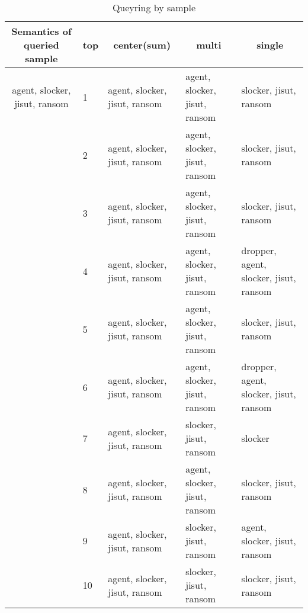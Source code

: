 \begin{table*}%
\caption{Queyring by sample}
\label{tab:sample_query_result}
\begin{minipage}{\textwidth}
\begin{center}
\begin{tabular}{@{}lllll@{}}
\toprule
\multicolumn{1}{c}{Semantics of queried sample}   & top & \multicolumn{1}{c}{center(sum)} & \multicolumn{1}{c}{multi}     & \multicolumn{1}{c}{single}             \\ \midrule
\multicolumn{1}{c}{agent, slocker, jisut, ransom} & 1   & agent, slocker, jisut, ransom  & agent, slocker, jisut, ransom & slocker, jisut, ransom                 \\
                                                  & 2   & agent, slocker, jisut, ransom  & agent, slocker, jisut, ransom & slocker, jisut, ransom                 \\
                                                  & 3   & agent, slocker, jisut, ransom  & agent, slocker, jisut, ransom & slocker, jisut, ransom                 \\
                                                  & 4   & agent, slocker, jisut, ransom  & agent, slocker, jisut, ransom & dropper, agent, slocker, jisut, ransom \\
                                                  & 5   & agent, slocker, jisut, ransom  & agent, slocker, jisut, ransom & slocker, jisut, ransom                 \\
                                                  & 6   & agent, slocker, jisut, ransom  & agent, slocker, jisut, ransom & dropper, agent, slocker, jisut, ransom \\
                                                  & 7   & agent, slocker, jisut, ransom  & slocker, jisut, ransom        & slocker                                \\
                                                  & 8   & agent, slocker, jisut, ransom  & agent, slocker, jisut, ransom & slocker, jisut, ransom                 \\
                                                  & 9   & agent, slocker, jisut, ransom  & slocker, jisut, ransom        & agent, slocker, jisut, ransom          \\
                                                  & 10  & agent, slocker, jisut, ransom  & slocker, jisut, ransom        & slocker, jisut, ransom                 \\ \bottomrule
\end{tabular}
\end{center}
\bigskip\centering
\end{minipage}
\end{table*}%

